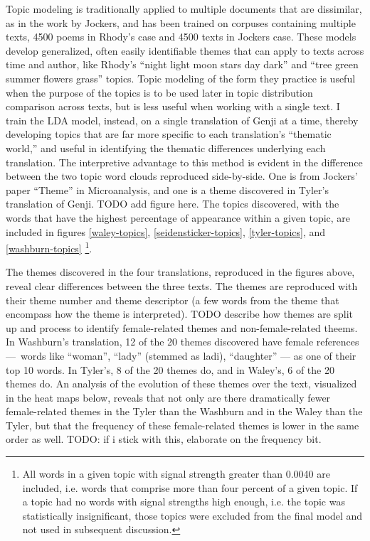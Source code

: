 \documentclass[12pt]{article}
\begin{document}
\begin{flushleft}
\begin{spacing}{2.0}
Topic modeling is traditionally applied to multiple documents that are dissimilar, as in the work by Jockers, and has been trained on corpuses containing multiple texts, 4500 poems in Rhody’s case and 4500 texts in Jockers case. These models develop generalized, often easily identifiable themes that can apply to texts across time and author, like Rhody’s ``night light moon stars day dark'' and ``tree green summer flowers grass'' topics. Topic modeling of the form they practice is useful when the purpose of the topics is to be used later in topic distribution comparison across texts, but is less useful when working with a single text. I train the LDA model, instead, on a single translation of Genji at a time, thereby developing topics that are far more specific to each translation’s ``thematic world,'' and useful in identifying the thematic differences underlying each translation. The interpretive advantage to this method is evident in the difference between the two topic word clouds reproduced side-by-side. One is from Jockers’ paper ``Theme'' in Microanalysis, and one is a theme discovered in Tyler’s translation of Genji. TODO add figure here. The topics discovered, with the words that have the highest percentage of appearance within a given topic, are included in figures \ref{waley-topics}, \ref{seidensticker-topics}, \ref{tyler-topics}, and \ref{washburn-topics} \footnote{All words in a given topic with signal strength greater than 0.0040 are included, i.e. words that comprise more than four percent of a given topic. If a topic had no words with signal strengths high enough, i.e. the topic was statistically insignificant, those topics were excluded from the final model and not used in subsequent discussion.}.

The themes discovered in the four translations, reproduced in the figures above, reveal clear differences between the three texts. The themes are reproduced with their theme number and theme descriptor (a few words from the theme that encompass how the theme is interpreted). TODO describe how themes are split up and process to identify female-related themes and non-female-related theems. In Washburn’s translation, 12 of the 20 themes discovered have female references --- words like ``woman'', ``lady'' (stemmed as ladi), ``daughter'' --- as one of their top 10 words. In Tyler’s, 8 of the 20 themes do, and in Waley’s, 6 of the 20 themes do. An analysis of the evolution of these themes over the text, visualized in the heat maps below, reveals that not only are there dramatically fewer female-related themes in the Tyler than the Washburn and in the Waley than the Tyler, but that the frequency of these female-related themes is lower in the same order as well. TODO: if i stick with this, elaborate on the frequency bit.


\end{spacing}
\end{flushleft}
\end{document}
